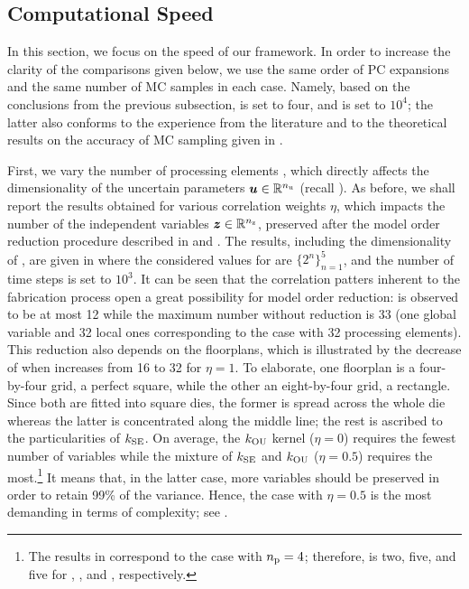\subsection{Computational Speed}

In this section, we focus on the speed of our framework. In order to increase
the clarity of the comparisons given below, we use the same order of PC
expansions and the same number of MC samples in each case. Namely, based on the
conclusions from the previous subsection, \lc is set to four, and \ns is set to
$10^4$; the latter also conforms to the experience from the literature
\cite{huang2009, lee2013, shen2009, bhardwaj2008, ghanta2006} and to the
theoretical results on the accuracy of MC sampling given in
\cite{diaz-emparanza2002}.

First, we vary the number of processing elements \np, which directly affects the
dimensionality of the uncertain parameters $\boldsymbol{u} \in \mathbb{R}^{n_\mathrm{u}}$ (recall
). As before, we shall report the results obtained
for various correlation weights $\eta$, which impacts the number of the
independent variables $\boldsymbol{z} \in \mathbb{R}^{n_\mathrm{z}}$, preserved after the model order
reduction procedure described in  and
. The results, including the dimensionality \nz of \vz, are
given in  where the considered values for \np
are $\{ 2^n \}_{n = 1}^5$, and the number of time steps \ns is set to $10^3$. It
can be seen that the correlation patters inherent to the fabrication process
\cite{cheng2011} open a great possibility for model order reduction: \nz is
observed to be at most 12 while the maximum number without reduction is 33 (one
global variable and 32 local ones corresponding to the case with 32 processing
elements). This reduction also depends on the floorplans, which is illustrated
by the decrease of \nz when \np increases from 16 to 32 for $\eta = 1$. To
elaborate, one floorplan is a four-by-four grid, a perfect square, while the
other an eight-by-four grid, a rectangle. Since both are fitted into square
dies, the former is spread across the whole die whereas the latter is
concentrated along the middle line; the rest is ascribed to the particularities
of $k_{\mathrm{SE}}$. On average, the $k_{\mathrm{OU}}$ kernel ($\eta = 0$) requires the fewest
number of variables while the mixture of $k_{\mathrm{SE}}$ and $k_{\mathrm{OU}}$ ($\eta = 0.5$)
requires the most.\footnote{The results in  correspond to the
case with ${n_\mathrm{p}} = 4$; therefore, \nz is two, five, and five for
, , and ,
respectively.} It means that, in the latter case, more variables should be
preserved in order to retain 99\% of the variance. Hence, the case with $\eta =
0.5$ is the most demanding in terms of complexity; see
.

